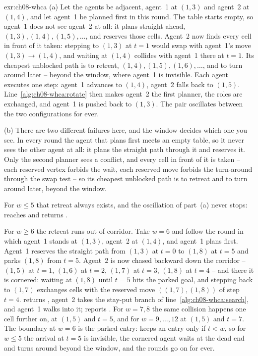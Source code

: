 \begin{solution}{exr:ch08-whca}
(a) Let the agents be adjacent, agent~1 at $(1,3)$ and agent~2 at $(1,4)$, and let agent~1 be planned first in this round. The table starts empty, so agent~1 does not see agent~2 at all: it plans straight ahead, $(1,3), (1,4), (1,5), \dots$, and reserves those cells. Agent~2 now finds every cell in front of it taken: stepping to $(1,3)$ at $t = 1$ would swap with agent~1's move $(1,3) \to (1,4)$, and waiting at $(1,4)$ collides with agent~1 there at $t = 1$. Its cheapest unblocked path is to retreat, $(1,4), (1,5), (1,6), \dots$, and to turn around later -- beyond the window, where agent~1 is invisible. Each agent executes one step: agent~1 advances to $(1,4)$, agent~2 falls back to $(1,5)$. Line~\ref{alg:ch08-whca:rotate} then makes agent~2 the first planner, the roles are exchanged, and agent~1 is pushed back to $(1,3)$. The pair oscillates between the two configurations for ever.

(b) There are two different failures here, and the window decides which one you see. In every round the agent that plans first meets an empty table, so it never sees the other agent at all: it plans the straight path through it and reserves it. Only the second planner sees a conflict, and every cell in front of it is taken -- each reserved vertex forbids the wait, each reserved move forbids the turn-around through the swap test -- so its cheapest unblocked path is to retreat and to turn around later, beyond the window.

For $w \le 5$ that retreat always exists, and the oscillation of part~(a) never stops:  reaches  and returns .

For $w \ge 6$ the retreat runs out of corridor. Take $w = 6$ and follow the round in which agent~1 stands at $(1,3)$, agent~2 at $(1,4)$, and agent~1 plans first. Agent~1 reserves the straight path from $(1,3)$ at $t = 0$ to $(1,8)$ at $t = 5$ and parks $(1,8)$ from $t = 5$. Agent~2 is now chased backward down the corridor -- $(1,5)$ at $t = 1$, $(1,6)$ at $t = 2$, $(1,7)$ at $t = 3$, $(1,8)$ at $t = 4$ -- and there it is cornered: waiting at $(1,8)$ until $t = 5$ hits the parked goal, and stepping back to $(1,7)$ exchanges cells with the reserved move $((1,7),(1,8))$ of step $t = 4$.  returns , agent~2 takes the stay-put branch of line~\ref{alg:ch08-whca:search}, and agent~1 walks into it;  reports . For $w = 7, 8$ the same collision happens one cell further on, at $(1,5)$ and $t = 5$, and for $w = 9, \dots, 12$ at $(1,5)$ and $t = 7$. The boundary at $w = 6$ is the parked entry:  keeps an entry only if $t < w$, so for $w \le 5$ the arrival at $t = 5$ is invisible, the cornered agent waits at the dead end and turns around beyond the window, and the rounds go on for ever.


\end{solution}
